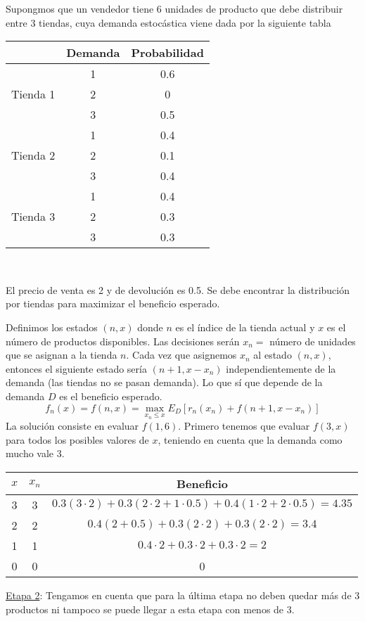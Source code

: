 \documentclass[MIOP.tex]{subfiles}
\begin{document}
\begin{ej}
Supongmos que un vendedor tiene 6 unidades de producto que debe distribuir entre 3 tiendas, cuya demanda estocástica viene dada por la siguiente tabla

\begin{tabular}{c|c|c|}
 & Demanda & Probabilidad\\
\hline
 	& 1 & 0.6\\
Tienda 1         & 2 & 0\\
         & 3 & 0.5\\
         \hline
 & 1 & 0.4      \\
 Tienda 2 & 2 & 0.1\\
          & 3 & 0.4\\
          \hline  
          & 1 & 0.4\\
  Tienda 3 & 2 & 0.3\\
  & 3 & 0.3\\
  \hline
\end{tabular}\

El precio de venta es 2 y de devolución es 0.5. Se debe encontrar la distribución por tiendas para maximizar el beneficio esperado.

Definimos los estados $(n,x)$ donde $n$ es el índice de la tienda actual y $x$ es el número de productos disponibles. Las decisiones serán $x_n=$ número de unidades que se asignan a la tienda $n$. Cada vez que asignemos $x_n$ al estado $(n,x)$, entonces el siguiente estado sería $(n+1,x-x_n)$ independientemente de la demanda (las tiendas no se pasan demanda). Lo que sí que depende de la demanda $D$ es el beneficio esperado.
$$f_n(x)=f(n,x)=\max_{x_n\leq x} E_D[r_n(x_n)+f(n+1,x-x_n)]$$
La solución consiste en evaluar $f(1,6)$. Primero tenemos que evaluar $f(3,x)$ para todos los posibles valores de $x$, teniendo en cuenta que la demanda como mucho vale 3. 

\begin{tabular}{|c|c|c|}
\hline
$x$ & $x_n$ & Beneficio\\ 
\hline
3 &    3    & $0.3(3\cdot 2)+0.3(2\cdot 2 + 1\cdot 0.5) +0.4(1\cdot 2 + 2\cdot 0.5) = 4.35$\\
2 &    2    & $0.4(2+0.5)+0.3(2\cdot 2)+0.3(2\cdot 2)=3.4$\\
1 &    1    & $0.4\cdot 2+ 0.3\cdot 2 + 0.3\cdot 2= 2$\\
0 &    0    & 0\\
\hline
\end{tabular}

\underline{Etapa 2}: Tengamos en cuenta que para la última etapa no deben quedar más de 3 productos ni tampoco se puede llegar a esta etapa con menos de 3.


\end{ej}
\end{document}
